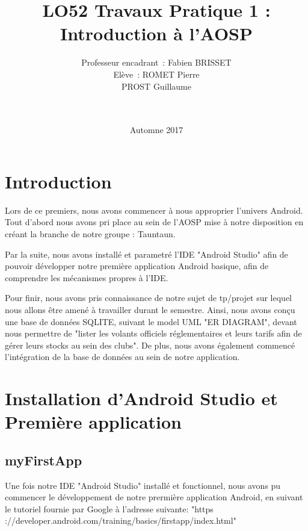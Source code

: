 \documentclass[french,a4paper,12pt]{report}
\title{LO52 Travaux Pratique 1 :\\ Introduction à l'AOSP}
\author{Professeur encadrant : Fabien BRISSET \\ Elève : ROMET Pierre
\\PROST Guillaume \\ \\ \\}
\date{Automne 2017}
\begin{document}
\maketitle
\tableofcontents

\chapter{Introduction}
Lors de ce premiers, nous avons commencer à nous approprier l'univers Android.
Tout d'abord nous avons pri place au sein de l'AOSP mise à notre disposition
en créant la branche de notre groupe : Tauntaun.

Par la suite, nous avons installé et parametré l'IDE "Android Studio" afin de
pouvoir développer notre première application Android basique, afin de
comprendre les mécanismes propres à l'IDE.

Pour finir, nous avons pris connaissance de notre sujet de tp/projet sur
lequel nous allons être amené à travailler durant le semestre.
Ainsi, nous avons conçu une base de données SQLITE, suivant le model UML
"ER DIAGRAM", devant nous permettre de "lister les volants officiels
réglementaires et leurs tarifs afin de gérer leurs stocks au sein des clubs".
De plus, nous avons également commencé l'intégration de la base de données au
sein de notre application.


\chapter{Installation d'Android Studio et Première application}
\section{myFirstApp}
Une fois notre IDE "Android Studio" installé et fonctionnel, nous avons pu
commencer le développement de notre prermière application Android, en suivant
le tutoriel fournie par Google à l'adresse suivante:
"https ://developer.android.com/training/basics/firstapp/index.html"
\end{document}
